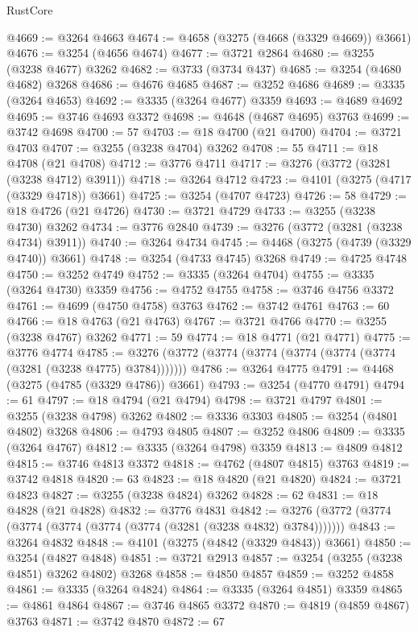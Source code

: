 \begin{lexlean}{RustCore}
\begin{coremodule}
@4669 := @3264 @4663
@4674 := @4658 (@3275 (@4668 (@3329 @4669)) @3661)
@4676 := @3254 (@4656 @4674)
@4677 := @3721 @2864
@4680 := @3255 (@3238 @4677) @3262
@4682 := @3733 (@3734 @437)
@4685 := @3254 (@4680 @4682) @3268
@4686 := @4676 @4685
@4687 := @3252 @4686
@4689 := @3335 (@3264 @4653)
@4692 := @3335 (@3264 @4677) @3359
@4693 := @4689 @4692
@4695 := @3746 @4693 @3372
@4698 := @4648 (@4687 @4695) @3763
@4699 := @3742 @4698
@4700 := 57
@4703 := @18 @4700 (@21 @4700)
@4704 := @3721 @4703
@4707 := @3255 (@3238 @4704) @3262
@4708 := 55
@4711 := @18 @4708 (@21 @4708)
@4712 := @3776 @4711
@4717 := @3276 (@3772 (@3281 (@3238 @4712) @3911))
@4718 := @3264 @4712
@4723 := @4101 (@3275 (@4717 (@3329 @4718)) @3661)
@4725 := @3254 (@4707 @4723)
@4726 := 58
@4729 := @18 @4726 (@21 @4726)
@4730 := @3721 @4729
@4733 := @3255 (@3238 @4730) @3262
@4734 := @3776 @2840
@4739 := @3276 (@3772 (@3281 (@3238 @4734) @3911))
@4740 := @3264 @4734
@4745 := @4468 (@3275 (@4739 (@3329 @4740)) @3661)
@4748 := @3254 (@4733 @4745) @3268
@4749 := @4725 @4748
@4750 := @3252 @4749
@4752 := @3335 (@3264 @4704)
@4755 := @3335 (@3264 @4730) @3359
@4756 := @4752 @4755
@4758 := @3746 @4756 @3372
@4761 := @4699 (@4750 @4758) @3763
@4762 := @3742 @4761
@4763 := 60
@4766 := @18 @4763 (@21 @4763)
@4767 := @3721 @4766
@4770 := @3255 (@3238 @4767) @3262
@4771 := 59
@4774 := @18 @4771 (@21 @4771)
@4775 := @3776 @4774
@4785 := @3276 (@3772 (@3774 (@3774 (@3774 (@3774 (@3774 (@3281 (@3238 @4775) @3784)))))))
@4786 := @3264 @4775
@4791 := @4468 (@3275 (@4785 (@3329 @4786)) @3661)
@4793 := @3254 (@4770 @4791)
@4794 := 61
@4797 := @18 @4794 (@21 @4794)
@4798 := @3721 @4797
@4801 := @3255 (@3238 @4798) @3262
@4802 := @3336 @3303
@4805 := @3254 (@4801 @4802) @3268
@4806 := @4793 @4805
@4807 := @3252 @4806
@4809 := @3335 (@3264 @4767)
@4812 := @3335 (@3264 @4798) @3359
@4813 := @4809 @4812
@4815 := @3746 @4813 @3372
@4818 := @4762 (@4807 @4815) @3763
@4819 := @3742 @4818
@4820 := 63
@4823 := @18 @4820 (@21 @4820)
@4824 := @3721 @4823
@4827 := @3255 (@3238 @4824) @3262
@4828 := 62
@4831 := @18 @4828 (@21 @4828)
@4832 := @3776 @4831
@4842 := @3276 (@3772 (@3774 (@3774 (@3774 (@3774 (@3774 (@3281 (@3238 @4832) @3784)))))))
@4843 := @3264 @4832
@4848 := @4101 (@3275 (@4842 (@3329 @4843)) @3661)
@4850 := @3254 (@4827 @4848)
@4851 := @3721 @2913
@4857 := @3254 (@3255 (@3238 @4851) @3262 @4802) @3268
@4858 := @4850 @4857
@4859 := @3252 @4858
@4861 := @3335 (@3264 @4824)
@4864 := @3335 (@3264 @4851) @3359
@4865 := @4861 @4864
@4867 := @3746 @4865 @3372
@4870 := @4819 (@4859 @4867) @3763
@4871 := @3742 @4870
@4872 := 67

\end{coremodule}
\end{lexlean}
